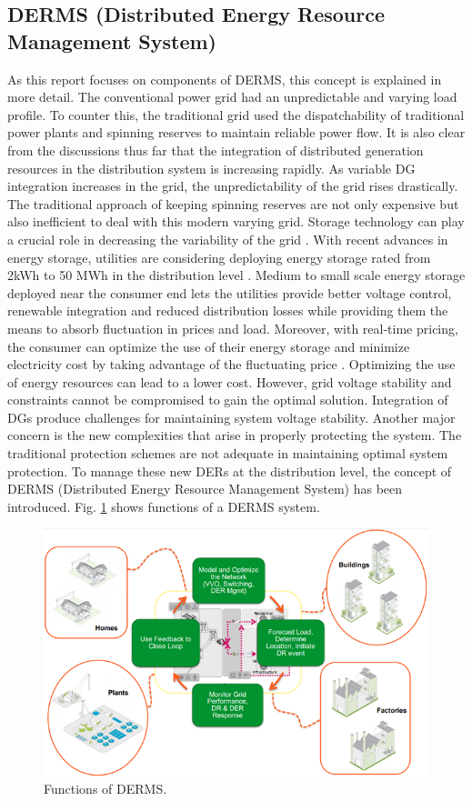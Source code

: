 \subsection{DERMS (Distributed Energy Resource Management System)}
As this report focuses on components of DERMS, this concept is explained in more detail. The conventional power grid had an unpredictable and varying load profile. To counter this, the traditional grid used the dispatchability of traditional power plants and spinning reserves to maintain reliable power flow. It is also clear from the discussions thus far that the integration of distributed generation resources in the distribution system is increasing rapidly. As variable DG integration increases in the grid, the unpredictability of the grid rises drastically. The traditional approach of keeping spinning reserves are not only expensive but also inefficient to deal with this modern varying grid. Storage technology can play a crucial role in decreasing the variability of the grid \cite{USD13}. With recent advances in energy storage, utilities are considering deploying energy storage rated from 2kWh to 50 MWh in the distribution level \cite{Cle12}. Medium to small scale energy storage deployed near the consumer end lets the utilities provide better voltage control, renewable integration and reduced distribution losses while providing them the means to absorb fluctuation in prices and load. Moreover, with real-time pricing, the consumer can optimize the use of their energy storage and minimize electricity cost by taking advantage of the fluctuating price \cite{BPR11,PMv13,ASB17}.
Optimizing the use of energy resources can lead to a lower cost. However, grid voltage stability and constraints cannot be compromised to gain the optimal solution. Integration of DGs produce challenges for maintaining system voltage stability. Another major concern is the new complexities that arise in properly protecting the system. The traditional protection schemes are not adequate in maintaining optimal system protection. To manage these new DERs at the distribution level, the concept of DERMS (Distributed Energy Resource Management System) has been introduced. Fig. \ref{fig:DERMS_ARCH} shows functions of a DERMS system. 

\begin{figure}[!h]
\centering
\includegraphics[width=0.85\linewidth]{figs/DERMS_ARCH.png}
\caption[Functions of DERMS.]{Functions of DERMS. \cite{DERMS_1}}
\label{fig:DERMS_ARCH}
\end{figure}

